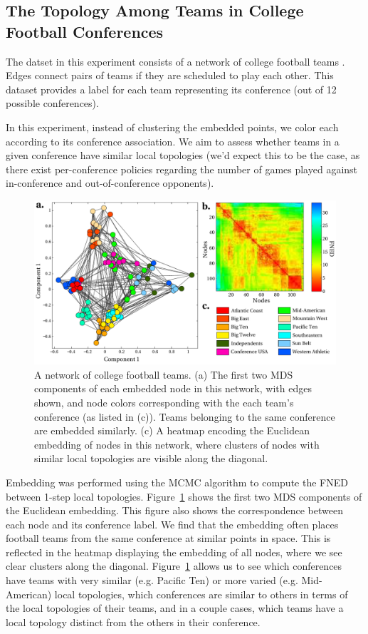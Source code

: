 \documentclass{article}
\begin{document}
\subsection{The Topology Among Teams in College Football Conferences}
The datset in this experiment consists of a network of college football teams \cite{newman2006finding}. Edges connect pairs of teams if they are scheduled to play each other. This dataset provides a label for each team representing its conference (out of 12 possible conferences). 

In this experiment, instead of clustering the embedded points, we color each according to its conference association. We aim to assess whether teams in a given conference have similar local topologies (we'd expect this to be the case, as there exist per-conference policies regarding the number of games played against in-conference and out-of-conference opponents).

\begin{figure}[h!tbp]
  \centering               
  \includegraphics[width=1\textwidth]{fig/fig4.pdf}
  \caption{A network of college football teams. (a) The first two MDS components of each embedded node in this network, with edges shown, and node colors corresponding with the each team's conference (as listed in (c)). Teams belonging to the same conference are embedded similarly. (c) A heatmap encoding the Euclidean embedding of nodes in this network, where clusters of nodes with similar local topologies are visible along the diagonal.}
  \label{fig:footballTeams}
\end{figure}

Embedding was performed using the MCMC algorithm to compute the FNED between 1-step local topologies. Figure~\ref{fig:footballTeams} shows the first two MDS components of the Euclidean embedding. This figure also shows the correspondence between each node and its conference label. We find that the embedding often places football teams from the same conference at similar points in space. This is reflected in the heatmap displaying the embedding of all nodes, where we see clear clusters along the diagonal. Figure~\ref{fig:footballTeams} allows us to see which conferences have teams with very similar (e.g. Pacific Ten) or more varied (e.g. Mid-American) local topologies, which conferences are similar to others in terms of the local topologies of their teams, and in a couple cases, which teams have a local topology distinct from the others in their conference. 
\end{document}
